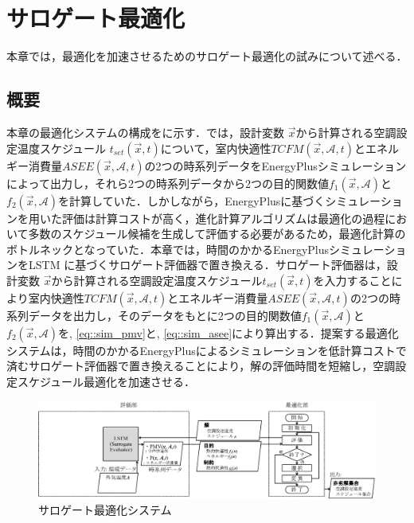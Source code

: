 \chapter{サロゲート最適化}
\label{chap::surrogate}
\hspace{1zw}本章では，最適化を加速させるためのサロゲート最適化の試みについて述べる．
\section{概要}
本章の最適化システムの構成をに示す．では，設計変数 $\vec{x}$から計算される空調設定温度スケジュール $t_{set}(\vec{x},t)$について，室内快適性$TCFM(\vec{x}, \mathcal{A}, t)$とエネルギー消費量$ASEE(\vec{x},\mathcal{A}, t)$の2つの時系列データをEnergyPlusシミュレーションによって出力し，それら2つの時系列データから2つの目的関数値$f_1(\vec{x}, \mathcal{A})$と$f_2(\vec{x}, \mathcal{A})$を計算していた．しかしながら，EnergyPlusに基づくシミュレーションを用いた評価は計算コストが高く，進化計算アルゴリズムは最適化の過程において多数のスケジュール候補を生成して評価する必要があるため，最適化計算のボトルネックとなっていた．本章では，時間のかかるEnergyPlusシミュレーションをLSTM \cite{Gers00}に基づくサロゲート評価器で置き換える．サロゲート評価器は，設計変数 $\vec{x}$から計算される空調設定温度スケジュール$t_{set}(\vec{x},t)$を入力することにより室内快適性$TCFM(\vec{x}, \mathcal{A}, t)$とエネルギー消費量$ASEE(\vec{x},\mathcal{A},t)$の2つの時系列データを出力し，そのデータをもとに2つの目的関数値$f_1(\vec{x}, \mathcal{A})$と$f_2(\vec{x}, \mathcal{A})$を, \eqref{eq::sim_pmv}と, \eqref{eq::sim_asee}により算出する．提案する最適化システムは，時間のかかるEnergyPlusによるシミュレーションを低計算コストで済むサロゲート評価器で置き換えることにより，解の評価時間を短縮し，空調設定スケジュール最適化を加速させる．

\begin{figure}[t]
  \begin{center}
    \includegraphics[width=1.1\linewidth]{fig/surrogate_system.eps}
  \end{center}
  \caption{サロゲート最適化システム}
  \label{fig::surrogate_system}
\end{figure}

